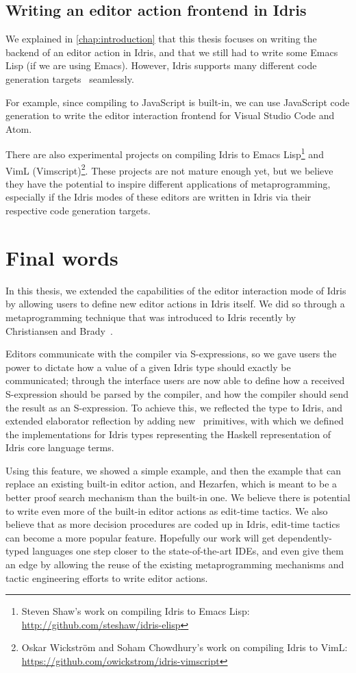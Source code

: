\subsection{Writing an editor action frontend in Idris}

We explained in \autoref{chap:introduction} that this thesis focuses on writing
the backend of an editor action in Idris, and that we still had to write some
Emacs Lisp (if we are using Emacs). However, Idris supports many different
code generation targets~\cite{idriscodegen} seamlessly.

For example, since compiling to JavaScript is built-in, we can use JavaScript
code generation to write the editor interaction frontend for Visual Studio Code
and Atom.

There are also experimental projects on compiling Idris to Emacs
Lisp\footnote{Steven Shaw's work on compiling Idris to Emacs Lisp:
\url{http://github.com/steshaw/idris-elisp}} and VimL
(Vimscript)\footnote{Oskar Wickstr\"om and Soham Chowdhury's work on
compiling Idris to VimL:
\url{https://github.com/owickstrom/idris-vimscript}}. These projects are not
mature enough yet, but we believe they have the potential to inspire different
applications of metaprogramming, especially if the Idris modes of these editors
are written in Idris via their respective code generation targets.

\section{Final words}

In this thesis, we extended the capabilities of the editor interaction mode of
Idris by allowing users to define new editor actions in Idris itself. We did
so through a metaprogramming technique that was introduced to Idris recently by
Christiansen and Brady~\cite{elabref}.

Editors communicate with the compiler via S-expressions, so we gave users the
power to dictate how a value of a given Idris type should exactly be
communicated; through the  interface users are now able to
define how a received S-expression should be parsed by the compiler, and how
the compiler should send the result as an S-expression. To achieve this, we
reflected the  type to Idris, and extended elaborator reflection
by adding new \Elab\ primitives, with which we defined the 
implementations for Idris types representing the Haskell representation of
Idris core language terms.

Using this feature, we showed a simple  example, and then the
 example that can replace an existing built-in editor action,
and Hezarfen, which is meant to be a better proof search mechanism than the
built-in one. We believe there is potential to write even more of the built-in
editor actions as edit-time tactics. We also believe that as more decision
procedures are coded up in Idris, edit-time tactics can become a more popular
feature.
Hopefully our work will get dependently-typed languages one step closer to the
state-of-the-art IDEs, and even give them an edge by allowing the reuse of the
existing metaprogramming mechanisms and tactic engineering efforts to write
editor actions.
